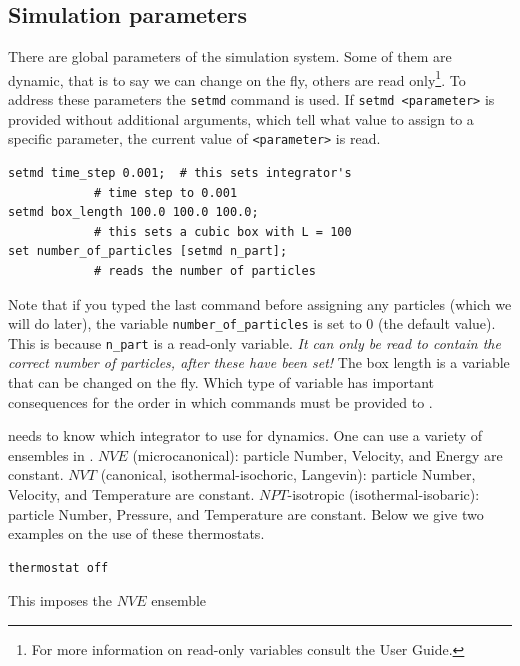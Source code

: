 \documentclass[
paper=a4,                       %
fontsize=11pt,                  %
twoside,                        %
footsepline,                    %
headsepline,                    %
headinclude=false,              %
footinclude=false,              %
pagesize,                       %
]{scrartcl}
\begin{document}
\subsection{Simulation parameters}

There are global parameters of the simulation system. Some of them are dynamic, that is to say we can change on the fly, others are read only\footnote{For more information on read-only variables consult the User Guide.}. To address these parameters the \lstinline|setmd| \es{} command is used. If \lstinline|setmd <parameter>| is provided without additional arguments, which tell \es{} what value to assign to a specific parameter, the current value of \lstinline|<parameter>| is read. 
  
{\small\vspace{0,2cm}
\begin{lstlisting}[numbers=none]
setmd time_step 0.001;	# this sets integrator's
			# time step to 0.001
setmd box_length 100.0 100.0 100.0;
			# this sets a cubic box with L = 100
set number_of_particles [setmd n_part];
			# reads the number of particles
\end{lstlisting}\vspace{0,2cm}
} 

\noindent Note that if you typed the last command before assigning any particles (which we will do later), the variable \texttt{number\_of\_particles} is set to 0 (the default value). This is because \texttt{n\_part} is a read-only variable. \emph{It can only be read to contain the correct number of particles, after these have been set!} The box length is a variable that can be changed on the fly. Which type of variable has important consequences for the order in which commands must be provided to \es{}. 

\es{} needs to know which integrator to use for dynamics. One can use a variety of ensembles in \es{}. $NVE$ (microcanonical): particle Number, Velocity, and Energy are constant. $NVT$ (canonical, isothermal-isochoric, Langevin): particle Number, Velocity, and Temperature are constant. $NPT$-isotropic (isothermal-isobaric): particle Number, Pressure, and Temperature are constant. Below we give two examples on the use of these thermostats.

{\small\vspace{0,2cm}
\begin{lstlisting}[numbers=none]
thermostat off
\end{lstlisting}}\vspace{0,2cm}
\noindent This imposes the $NVE$ ensemble
\end{document}
